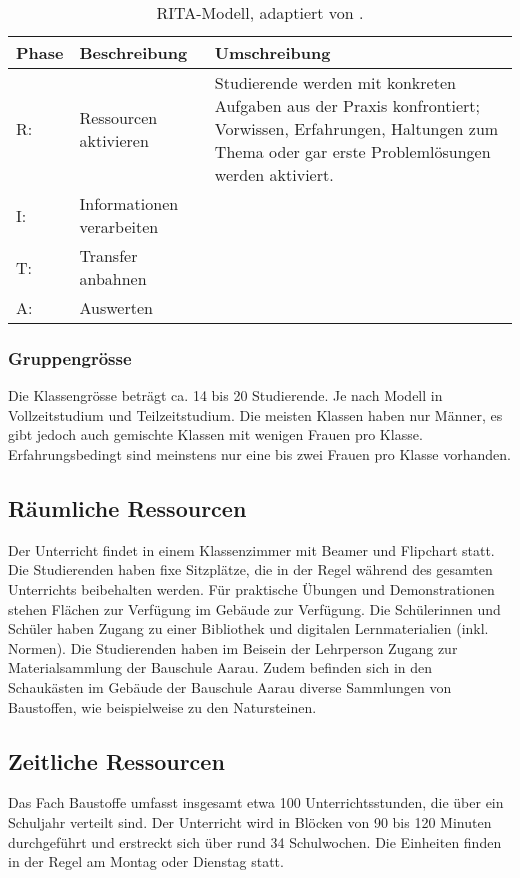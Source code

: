 \documentclass[
11pt,
captions=tableheading,
smallheadings,
headsepline,
footsepline, 
captions=tableheading,
parskip=half-,
]{scrartcl}
\begin{document}
\begin{table}[H]
    \centering
    \label{tab:RITA_Modell}
    \caption{RITA-Modell, adaptiert von \cite{BerufspädagogischesKonzept_BauschuleAarau}.}
    \begin{tabularx}{\textwidth}{@{}llp{9.5cm}@{}}
    \toprule
    \textbf{Phase} & \textbf{Beschreibung} & \textbf{Umschreibung} \\
    \midrule
    R:  & Ressourcen aktivieren & Studierende werden mit konkreten Aufgaben aus der Praxis konfrontiert; Vorwissen, Erfahrungen, Haltungen zum Thema oder gar erste Problemlösungen werden aktiviert. \\
    I: & Informationen verarbeiten & {} \\
    T: & Transfer anbahnen & {} \\
    A: & Auswerten & {} \\
    \bottomrule
    \end{tabularx}
    \end{table}

\subsubsection{Gruppengrösse}
Die Klassengrösse beträgt ca. 14 bis 20 Studierende.
Je nach Modell in Vollzeitstudium und Teilzeitstudium.
Die meisten Klassen haben nur Männer, es gibt jedoch auch gemischte Klassen mit wenigen Frauen pro Klasse. Erfahrungsbedingt sind meinstens nur eine bis zwei Frauen pro Klasse vorhanden.


\subsection{Räumliche Ressourcen}
Der Unterricht findet in einem Klassenzimmer mit Beamer und Flipchart statt. 
Die Studierenden haben fixe Sitzplätze, die in der Regel während des gesamten Unterrichts beibehalten werden.
Für praktische Übungen und Demonstrationen stehen Flächen zur Verfügung im Gebäude zur Verfügung. Die Schülerinnen und Schüler haben Zugang zu einer Bibliothek und digitalen Lernmaterialien (inkl. Normen).
Die Studierenden haben im Beisein der Lehrperson Zugang zur Materialsammlung der Bauschule Aarau.
Zudem befinden sich in den Schaukästen im Gebäude der Bauschule Aarau diverse Sammlungen von Baustoffen, wie beispielweise zu den Natursteinen.

\subsection{Zeitliche Ressourcen}
Das Fach Baustoffe umfasst insgesamt etwa 100 Unterrichtsstunden, die über ein Schuljahr verteilt sind. Der Unterricht wird in Blöcken von 90 bis 120 Minuten durchgeführt und erstreckt sich über rund 34 Schulwochen. 
Die Einheiten finden in der Regel am Montag oder Dienstag statt.
\end{document}

